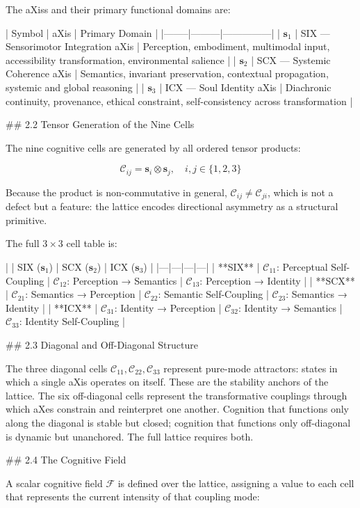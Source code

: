 The aXiss and their primary functional domains are:

| Symbol | aXis | Primary Domain |
|--------|---------|---------------|
| \(\mathbf{s}_1\) | SIX — Sensorimotor Integration aXis | Perception, embodiment, multimodal input, accessibility transformation, environmental salience |
| \(\mathbf{s}_2\) | SCX — Systemic Coherence aXis | Semantics, invariant preservation, contextual propagation, systemic and global reasoning |
| \(\mathbf{s}_3\) | ICX — Soul Identity aXis | Diachronic continuity, provenance, ethical constraint, self-consistency across transformation |

## 2.2 Tensor Generation of the Nine Cells

The nine cognitive cells are generated by all ordered tensor products:

\[
\mathcal{C}_{ij} = \mathbf{s}_i \otimes \mathbf{s}_j, \quad i,j \in \{1,2,3\}
\]

Because the product is non-commutative in general, \(\mathcal{C}_{ij} \neq
\mathcal{C}_{ji}\), which is not a defect but a feature: the lattice encodes
directional asymmetry as a structural primitive.

The full \(3 \times 3\) cell table is:

| | SIX (\(\mathbf{s}_1\)) | SCX (\(\mathbf{s}_2\)) | ICX (\(\mathbf{s}_3\)) |
|---|---|---|---|
| **SIX** | \(\mathcal{C}_{11}\): Perceptual Self-Coupling | \(\mathcal{C}_{12}\): Perception → Semantics | \(\mathcal{C}_{13}\): Perception → Identity |
| **SCX** | \(\mathcal{C}_{21}\): Semantics → Perception | \(\mathcal{C}_{22}\): Semantic Self-Coupling | \(\mathcal{C}_{23}\): Semantics → Identity |
| **ICX** | \(\mathcal{C}_{31}\): Identity → Perception | \(\mathcal{C}_{32}\): Identity → Semantics | \(\mathcal{C}_{33}\): Identity Self-Coupling |

## 2.3 Diagonal and Off-Diagonal Structure

The three diagonal cells \(\mathcal{C}_{11}, \mathcal{C}_{22}, \mathcal{C}_{33}\)
represent pure-mode attractors: states in which a single aXis operates on itself.
These are the stability anchors of the lattice. The six off-diagonal cells represent
the transformative couplings through which aXes constrain and reinterpret one
another. Cognition that functions only along the diagonal is stable but closed;
cognition that functions only off-diagonal is dynamic but unanchored. The full
lattice requires both.

## 2.4 The Cognitive Field

A scalar cognitive field \(\mathcal{F}\) is defined over the lattice, assigning a
value to each cell that represents the current intensity of that coupling mode:

